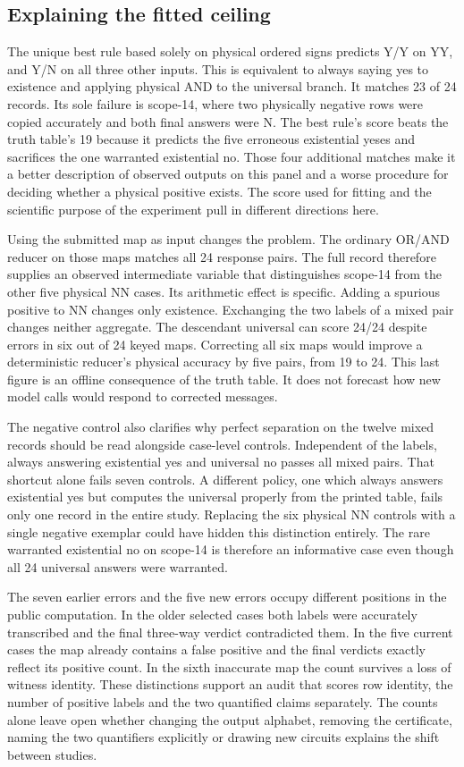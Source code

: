 \documentclass[12pt,letterpaper]{article}
\begin{document}
\subsection{Explaining the fitted ceiling}
The unique best rule based solely on physical ordered signs predicts Y/Y on YY, and Y/N on all three other inputs. This is equivalent to always saying yes to existence and applying physical AND to the universal branch. It matches 23 of 24 records. Its sole failure is scope-14, where two physically negative rows were copied accurately and both final answers were N. The best rule's score beats the truth table's 19 because it predicts the five erroneous existential yeses and sacrifices the one warranted existential no. Those four additional matches make it a better description of observed outputs on this panel and a worse procedure for deciding whether a physical positive exists. The score used for fitting and the scientific purpose of the experiment pull in different directions here.

Using the submitted map as input changes the problem. The ordinary OR/AND reducer on those maps matches all 24 response pairs. The full record therefore supplies an observed intermediate variable that distinguishes scope-14 from the other five physical NN cases. Its arithmetic effect is specific. Adding a spurious positive to NN changes only existence. Exchanging the two labels of a mixed pair changes neither aggregate. The descendant universal can score 24/24 despite errors in six out of 24 keyed maps. Correcting all six maps would improve a deterministic reducer's physical accuracy by five pairs, from 19 to 24. This last figure is an offline consequence of the truth table. It does not forecast how new model calls would respond to corrected messages.

The negative control also clarifies why perfect separation on the twelve mixed records should be read alongside case-level controls. Independent of the labels, always answering existential yes and universal no passes all mixed pairs. That shortcut alone fails seven controls. A different policy, one which always answers existential yes but computes the universal properly from the printed table, fails only one record in the entire study. Replacing the six physical NN controls with a single negative exemplar could have hidden this distinction entirely. The rare warranted existential no on scope-14 is therefore an informative case even though all 24 universal answers were warranted.

The seven earlier errors and the five new errors occupy different positions in the public computation. In the older selected cases both labels were accurately transcribed and the final three-way verdict contradicted them. In the five current cases the map already contains a false positive and the final verdicts exactly reflect its positive count. In the sixth inaccurate map the count survives a loss of witness identity. These distinctions support an audit that scores row identity, the number of positive labels and the two quantified claims separately. The counts alone leave open whether changing the output alphabet, removing the certificate, naming the two quantifiers explicitly or drawing new circuits explains the shift between studies.
\end{document}
